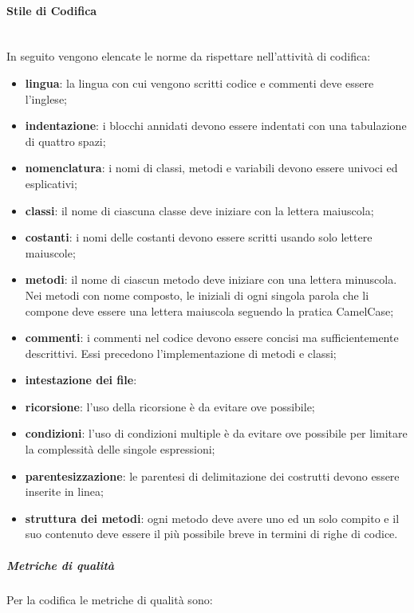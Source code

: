 		\paragraph*{Stile di Codifica}\mbox{}\\ [1mm]
		In seguito vengono elencate le norme da rispettare nell'attività di codifica:
		\begin{itemize}
			\item \textbf{lingua}: la lingua con cui vengono scritti codice e commenti deve essere l'inglese;
			\item \textbf{indentazione}: i blocchi annidati devono essere indentati con una tabulazione di quattro spazi;
			\item \textbf{nomenclatura}: i nomi di classi, metodi e variabili devono essere univoci ed esplicativi;
			\item \textbf{classi}: il nome di ciascuna classe deve iniziare con la lettera maiuscola; 
			\item \textbf{costanti}: i nomi delle costanti devono essere scritti usando solo lettere maiuscole;
			\item \textbf{metodi}: il nome di ciascun metodo deve iniziare con una lettera minuscola. Nei metodi con nome composto, le iniziali di ogni singola parola che li compone deve essere una lettera maiuscola seguendo la pratica CamelCase;
			\item \textbf{commenti}: i commenti nel codice devono essere concisi ma sufficientemente descrittivi. Essi precedono l'implementazione di metodi e classi;
			\item \textbf{intestazione dei file}: %
			\item \textbf{ricorsione}: l'uso della ricorsione è da evitare ove possibile;
			\item \textbf{condizioni}: l'uso di condizioni multiple è da evitare ove possibile per limitare la complessità delle singole espressioni;
			\item \textbf{parentesizzazione}: le parentesi di delimitazione dei costrutti devono essere inserite in linea;
			\item \textbf{struttura dei metodi}: ogni metodo deve avere uno ed un solo compito e il suo contenuto deve essere il più possibile breve in termini di righe di codice.
		\end{itemize}
		\subparagraph{Metriche di qualità}
		Per la codifica le metriche di qualità sono:
